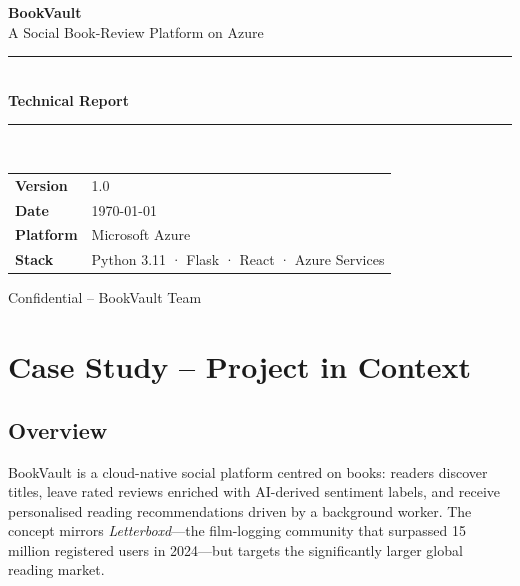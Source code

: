 \documentclass[12pt, a4paper]{report}
\begin{document}
\begin{titlepage}
  \centering
  \vspace*{2cm}

  {\Huge\bfseries\color{primaryblue} BookVault}\\[0.5em]
  {\Large\color{accentblue} A Social Book-Review Platform on Azure}\\[3cm]

  \rule{\textwidth}{1.5pt}\\[0.5em]
  {\LARGE\bfseries Technical Report}\\[0.5em]
  \rule{\textwidth}{1.5pt}\\[3cm]

  \begin{tabular}{ll}
    \textbf{Version}  & 1.0 \\[0.4em]
    \textbf{Date}     & \today \\[0.4em]
    \textbf{Platform} & Microsoft Azure \\[0.4em]
    \textbf{Stack}    & Python 3.11 · Flask · React · Azure Services \\
  \end{tabular}

  \vfill
  {\small\color{darkgray} Confidential – BookVault Team}
\end{titlepage}

\tableofcontents
\clearpage

\chapter{Case Study – Project in Context}

\section{Overview}

BookVault is a cloud-native social platform centred on books: readers discover titles, leave
rated reviews enriched with AI-derived sentiment labels, and receive personalised reading
recommendations driven by a background worker.  The concept mirrors \textit{Letterboxd}—the
film-logging community that surpassed 15 million registered users in 2024—but targets the
significantly larger global reading market.
\end{document}
